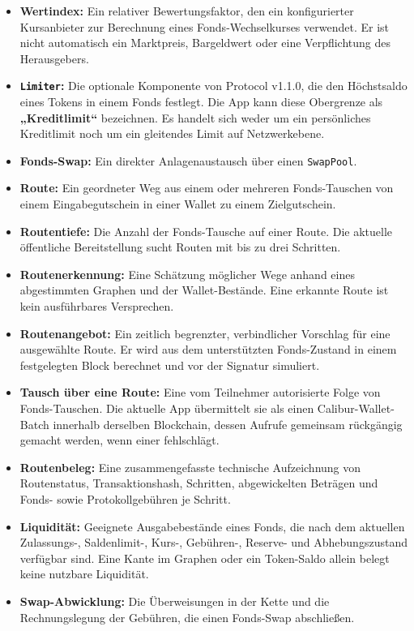 \documentclass[11pt]{article}
\begin{document}
\begin{itemize}[leftmargin=*]
\item \textbf{Wertindex:} Ein relativer Bewertungsfaktor, den ein konfigurierter Kursanbieter zur Berechnung eines Fonds-Wechselkurses verwendet. Er ist nicht automatisch ein Marktpreis, Bargeldwert oder eine Verpflichtung des Herausgebers.
\item \textbf{\texttt{Limiter}:} Die optionale Komponente von Protocol v1.1.0, die den Höchstsaldo eines Tokens in einem Fonds festlegt. Die App kann diese Obergrenze als \textbf{„Kreditlimit``} bezeichnen. Es handelt sich weder um ein persönliches Kreditlimit noch um ein gleitendes Limit auf Netzwerkebene.
\item \textbf{Fonds-Swap:} Ein direkter Anlagenaustausch über einen \texttt{SwapPool}.
\item \textbf{Route:} Ein geordneter Weg aus einem oder mehreren Fonds-Tauschen von einem Eingabegutschein in einer Wallet zu einem Zielgutschein.
\item \textbf{Routentiefe:} Die Anzahl der Fonds-Tausche auf einer Route. Die aktuelle öffentliche Bereitstellung sucht Routen mit bis zu drei Schritten.
\item \textbf{Routenerkennung:} Eine Schätzung möglicher Wege anhand eines abgestimmten Graphen und der Wallet-Bestände. Eine erkannte Route ist kein ausführbares Versprechen.
\item \textbf{Routenangebot:} Ein zeitlich begrenzter, verbindlicher Vorschlag für eine ausgewählte Route. Er wird aus dem unterstützten Fonds-Zustand in einem festgelegten Block berechnet und vor der Signatur simuliert.
\item \textbf{Tausch über eine Route:} Eine vom Teilnehmer autorisierte Folge von Fonds-Tauschen. Die aktuelle App übermittelt sie als einen Calibur-Wallet-Batch innerhalb derselben Blockchain, dessen Aufrufe gemeinsam rückgängig gemacht werden, wenn einer fehlschlägt.
\item \textbf{Routenbeleg:} Eine zusammengefasste technische Aufzeichnung von Routenstatus, Transaktionshash, Schritten, abgewickelten Beträgen und Fonds- sowie Protokollgebühren je Schritt.
\item \textbf{Liquidität:} Geeignete Ausgabebestände eines Fonds, die nach dem aktuellen Zulassungs-, Saldenlimit-, Kurs-, Gebühren-, Reserve- und Abhebungszustand verfügbar sind. Eine Kante im Graphen oder ein Token-Saldo allein belegt keine nutzbare Liquidität.
\item \textbf{Swap-Abwicklung:} Die Überweisungen in der Kette und die Rechnungslegung der Gebühren, die einen Fonds-Swap abschließen.

\end{itemize}
\end{document}
